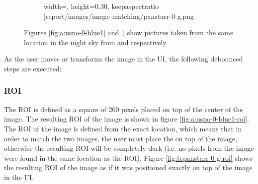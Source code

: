 \begin{figure}[H]
\begin{subfigure}{.5\textwidth}
            width=\textwidth,
            height=0.30\textheight,
            keepaspectratio
      ]{report/images/image-matching/panstarr-0-g.png}
      \caption{\panstarrs}
      \label{fig:b:panstarr-0-g}
    \end{subfigure}
    \caption{Figures \ref{fig:a:usno-0-blue1} and \ref{fig:b:panstarr-0-g} show pictures taken from the same location in the night sky from \usno and \panstarrs respectively.}
    \label{fig:mission-0}
\end{figure}

As the user moves or transforms the \panstarrs image in the UI, the following debounced steps are executed:

\subsubsection{ROI} \label{subsubsect:case-study:impl:roi}

The ROI is defined as a square of 200 pixels placed on top of the center of the \usno image. The resulting ROI of the \usno image is shown in figure \ref{fig:a:usno-0-blue1-roi}. The ROI of the \panstarrs image is defined from the exact location, which means that in order to match the two images, the user must place the \panstarrs on top of the \usno image, otherwise the resulting ROI will be completely dark (i.e. no pixels from the \panstarrs image were found in the same location as the \usno ROI). Figure \ref{fig:b:panstarr-0-g-roi} shows the resulting ROI of the \panstarrs image as if it was positioned exactly on top of the \usno image in the UI.

